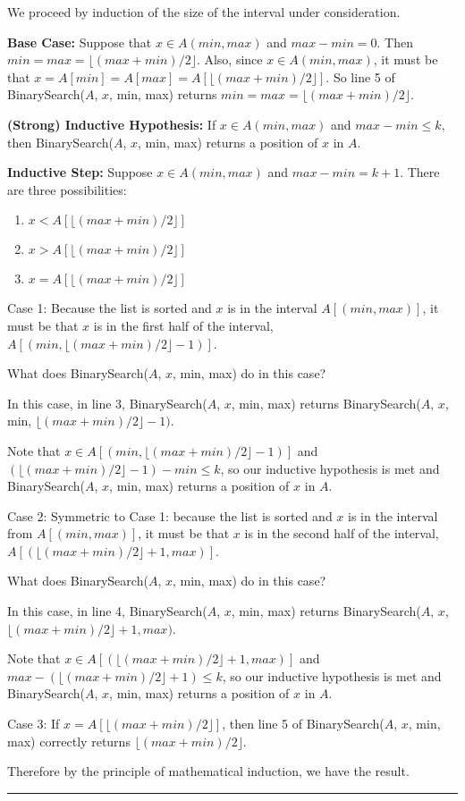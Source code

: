 \documentclass[twoside]{article}
\newenvironment{proof}{{\bf Proof:}}{\hfill\rule{2mm}{2mm}}
\begin{document}
\begin{proof}
We proceed by induction of the size of the interval under
consideration.

  {\bf Base Case:} Suppose that $x\in A(min,max)$ and $max - min =
  0$. Then $min = max = \lfloor (max + min)/2\rfloor$. Also, since
  $x\in A(min,max)$, it must be that
  $x = A[min] = A[max] = A[\lfloor (max + min)/2\rfloor]$. So line 5
of {\sc BinarySearch($A$, $x$, min, max)} returns
$min = max = \lfloor (max + min)/2\rfloor$.

{\bf (Strong) Inductive Hypothesis: }If $x\in A(min,max)$ and
$max - min \leq k$, then {\sc BinarySearch($A$, $x$, min, max)}
returns a position of $x$ in $A$.

{\bf Inductive Step: }Suppose $x\in A(min,max)$ and $max - min = k +
1$. There are three possibilities:
\begin{enumerate}
\item $x < A[\lfloor (max + min)/2\rfloor]$
\item $x > A[\lfloor (max + min)/2\rfloor]$
\item $x = A[\lfloor (max + min)/2\rfloor]$
\end{enumerate}

Case 1: Because the list is sorted and $x$ is in the interval 
$A[(min,max)]$, it must be that $x$ is in the first half of the
interval, $A[(min, \lfloor (max + min)/2\rfloor - 1)]$.

What does {\sc BinarySearch($A$, $x$, min, max)} do in this case? 

In this case, in line 3, {\sc BinarySearch($A$, $x$, min, max)}
returns {\sc BinarySearch($A$, $x$, min, $\lfloor (max + min)/2\rfloor
  - 1)$}.

Note that $x \in A[(min, \lfloor (max + min)/2\rfloor - 1)]$ and
$(\lfloor (max + min)/2\rfloor - 1) - min \leq k$, so our inductive
hypothesis is met and {\sc BinarySearch($A$, $x$, min, max)}
returns a position of $x$ in $A$.

Case 2: Symmetric to Case 1: because the list is sorted and $x$ is
in the interval from $A[(min,max)]$, it must be that $x$ is in the
second half of the interval,
$A[( \lfloor (max + min)/2\rfloor + 1, max)]$.

What does {\sc BinarySearch($A$, $x$, min, max)} do in this case? 

In this case, in line 4, {\sc BinarySearch($A$, $x$, min, max)}
returns {\sc BinarySearch($A$, $x$, $\lfloor (max + min)/2\rfloor
  + 1, max)$}.

Note that $x \in A[(\lfloor (max + min)/2\rfloor + 1, max)]$ and
$max - (\lfloor (max + min)/2\rfloor + 1) \leq k$, so our inductive
hypothesis is met and {\sc BinarySearch($A$, $x$, min, max)}
returns a position of $x$ in $A$.

Case 3: If $x = A[\lfloor (max + min)/2\rfloor]$, then line 5 of {\sc
  BinarySearch($A$, $x$, min, max)} correctly returns $\lfloor (max +
min)/2\rfloor$.

Therefore by the principle of mathematical induction, we have the result.

\end{proof}
\end{document}
